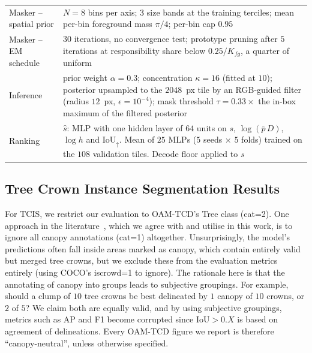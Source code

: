 \documentclass[remotesensing,article,submit,moreauthors]{Definitions/mdpi}
\begin{document}
\begin{table}[H]
\begin{tabularx}{\textwidth}{KV}
Masker -- spatial prior & $N = 8$ bins per axis; $3$ size bands at the training terciles; mean per-bin foreground mass $\pi/4$; per-bin cap $0.95$ \\
Masker -- EM schedule & $30$ iterations, no convergence test; prototype pruning after $5$ iterations at responsibility share below $0.25/K_{fg}$, a quarter of uniform \\
\midrule
Inference & prior weight $\alpha = 0.3$; concentration $\kappa = 16$ (fitted at $10$); posterior upsampled to the $2048$~px tile by an RGB-guided filter (radius $12$~px, $\epsilon = 10^{-4}$); mask threshold $\tau = 0.33\times$ the in-box maximum of the filtered posterior \\
Ranking & $\hat s$: MLP with one hidden layer of $64$ units on $s$, $\log(\bar p\,D)$, $\log h$ and $\mathrm{IoU}_{\uparrow}$. Mean of $25$ MLPs ($5$ seeds $\times$ $5$ folds) trained on the $108$ validation tiles. Decode floor applied to $s$ \\
\bottomrule
\end{tabularx}
\end{table}


\subsection{Tree Crown Instance Segmentation Results}


For TCIS, we restrict our evaluation to OAM-TCD's Tree class (cat=2). One approach in the literature~\cite{selvabox}, which we agree with and utilise in this work, is to ignore all canopy annotations (cat=1) altogether. Unsurprisingly, the model's predictions often fall inside areas marked as canopy, which contain entirely valid but merged tree crowns, but we exclude these from the evaluation metrics entirely (using COCO's iscrowd=1 to ignore). The rationale here is that the annotating of canopy into groups leads to subjective groupings. For example, should a clump of $10$ tree crowns be best delineated by $1$ canopy of $10$ crowns, or $2$ of $5$? We claim both are equally valid, and by using subjective groupings, metrics such as AP and F1 become corrupted since $\mathrm{IoU}>0.X$ is based on agreement of delineations. Every OAM-TCD figure we report is therefore ``canopy-neutral'', unless otherwise specified.
\end{document}
